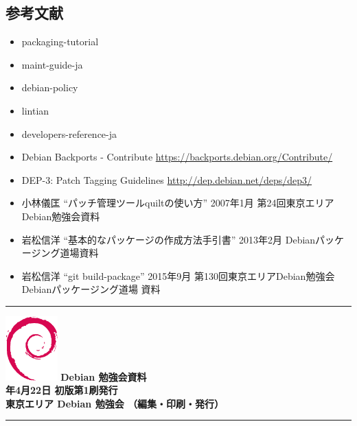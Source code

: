 \documentclass[mingoth,a4paper]{jsarticle}
\newcommand{\debmtgyear}{2017}
\newcommand{\debmtgmonth}{4}
\newcommand{\debmtgdate}{22}
\begin{document}
\subsection{参考文献}

\begin{itemize}
 \item packaging-tutorial
 \item maint-guide-ja
 \item debian-policy
 \item lintian
 \item developers-reference-ja
 \item Debian Backports - Contribute
       \url{https://backports.debian.org/Contribute/}
 \item DEP-3: Patch Tagging Guidelines \url{http://dep.debian.net/deps/dep3/}
 \item 小林儀匡 ``パッチ管理ツールquiltの使い方'' 2007年1月 第24回東京エリアDebian勉強会資料
 \item 岩松信洋 ``基本的なパッケージの作成方法手引書'' 2013年2月 Debianパッケージング道場資料
 \item 岩松信洋 ``git build-package'' 2015年9月 第130回東京エリアDebian勉強会 Debianパッケージング道場 資料
\end{itemize}

%
\mbox{}\newpage


\vspace*{15cm}
\hrule
\vspace{2mm}
\includegraphics[width=2cm]{image200502/openlogo-nd.eps}
\noindent \Large \bf Debian 勉強会資料\\
\noindent \normalfont \debmtgyear{}年\debmtgmonth{}月\debmtgdate{}日 \hspace{5mm}  初版第1刷発行\\
\noindent \normalfont 東京エリア Debian 勉強会 （編集・印刷・発行）\\
\hrule
\end{document}
